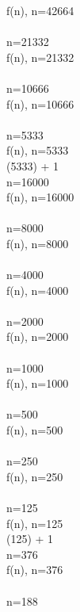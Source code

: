 \documentclass{article}
\begin{document}
f(n), n=42664
 \\ 
 \Rightarrow {} 
 \\ 
 \Rightarrow n=21332
 \\[3mm] 
f(n), n=21332
 \\ 
 \Rightarrow {} 
 \\ 
 \Rightarrow n=10666
 \\[3mm] 
f(n), n=10666
 \\ 
 \Rightarrow {} 
 \\ 
 \Rightarrow n=5333
 \\[3mm] 
f(n), n=5333
 \\ 
 (5333) + 1
 \\ 
 \Rightarrow n=16000
 \\[3mm] 
f(n), n=16000
 \\ 
 \Rightarrow {} 
 \\ 
 \Rightarrow n=8000
 \\[3mm] 
f(n), n=8000
 \\ 
 \Rightarrow {} 
 \\ 
 \Rightarrow n=4000
 \\[3mm] 
f(n), n=4000
 \\ 
 \Rightarrow {} 
 \\ 
 \Rightarrow n=2000
 \\[3mm] 
f(n), n=2000
 \\ 
 \Rightarrow {} 
 \\ 
 \Rightarrow n=1000
 \\[3mm] 
f(n), n=1000
 \\ 
 \Rightarrow {} 
 \\ 
 \Rightarrow n=500
 \\[3mm] 
f(n), n=500
 \\ 
 \Rightarrow {} 
 \\ 
 \Rightarrow n=250
 \\[3mm] 
f(n), n=250
 \\ 
 \Rightarrow {} 
 \\ 
 \Rightarrow n=125
 \\[3mm] 
f(n), n=125
 \\ 
 (125) + 1
 \\ 
 \Rightarrow n=376
 \\[3mm] 
f(n), n=376
 \\ 
 \Rightarrow {} 
 \\ 
 \Rightarrow n=188
 \\[3mm] 
\end{document}
